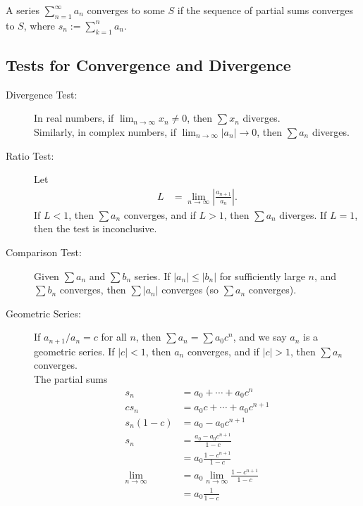 \documentclass[10pt]{extarticle}
\begin{document}
  A series $\displaystyle\sum_{n=1}^{\infty}a_n$ converges to some $S$ if the sequence of partial sums converges to $S$, where $\displaystyle s_n := \sum_{k=1}^{n}a_n$.
  \subsection{Tests for Convergence and Divergence}%
  \begin{description}
    \item[Divergence Test:] In real numbers, if $\lim_{n\rightarrow\infty}x_n \neq 0$, then $\sum x_n$ diverges.\\

      Similarly, in complex numbers, if $\lim_{n\rightarrow\infty}|a_n| \rightarrow 0$, then $\sum a_n$ diverges.
    \item[Ratio Test:] Let
      \begin{align*}
        L &= \lim_{n\rightarrow\infty}\left|\frac{a_{n+1}}{a_n}\right|.
      \end{align*}
      If $L < 1$, then $\sum a_n$ converges, and if $L > 1$, then $\sum a_n$ diverges. If $L=1$, then the test is inconclusive.
    \item[Comparison Test:] Given $\sum a_n$ and $\sum b_n$ series. If $|a_n| \leq |b_n|$ for sufficiently large $n$, and $\sum b_n$ converges, then $\sum |a_n|$ converges (so $\sum a_n$ converges).\\
    \item[Geometric Series:] If $a_{n+1}/a_n = c$ for all $n$, then $\sum a_n = \sum a_0c^n$, and we say $a_n$ is a geometric series. If $|c| < 1$, then $a_n$ converges, and if $|c| > 1$, then $\sum a_n$ converges.\\

      The partial sums
      \begin{align*}
        s_n &= a_0 + \cdots + a_0c^n\\
        cs_n &= a_0c + \cdots + a_0c^{n+1}\\
        s_n(1-c) &= a_0 - a_0c^{n+1}\\
        s_n &= \frac{a_0 - a_0c^{n+1}}{1-c}\\
            &= a_0 \frac{1-c^{n+1}}{1-c}\\
        \lim_{n\rightarrow\infty} &= a_0 \lim_{n\rightarrow\infty}\frac{1-c^{n+1}}{1-c}\\
                                  &= a_0\frac{1}{1-c} \tag*{since $|c|<1$}
      \end{align*}
  \end{description}
\end{document}
